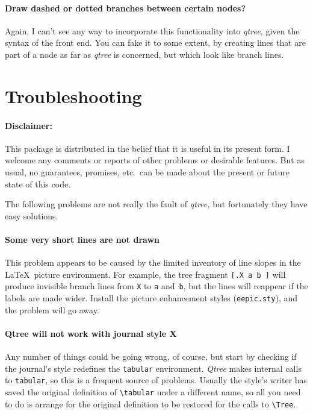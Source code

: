 \documentclass[11pt]{article}
\begin{document}
\paragraph{Draw dashed or dotted branches between certain nodes?}
Again, I can't see any way to incorporate this functionality into
\emph{qtree,} given the syntax of the front end.  You can fake it to some
extent, by creating lines that are part of a node as far as \emph{qtree} is
concerned, but which look like branch lines.


\section{Troubleshooting}
\paragraph*{Disclaimer:} This package is
distributed in the belief that it is useful in its present form.  
I welcome any comments or reports of other problems or desirable features.
But as usual, no guarantees, promises, etc.\ can be made about the present or
future state of this code.  

The following problems are not
really the fault of {\it qtree,\/} but fortunately they have easy solutions.

\paragraph{Some very short lines are not drawn}
This problem appears to be caused by the limited inventory of line slopes in
the \LaTeX\ picture environment.  For example, the tree fragment 
\verb|[.X a b ]| will produce invisible branch lines from \verb|X| to 
\verb|a| and~\verb|b|,
but the lines will reappear if the labels are made wider.  Install the picture
enhancement styles ({\tt eepic.sty\/}), and the problem will go away.

\paragraph{Qtree will not work with journal style X}

Any number of things could be going wrong, of course, but start by checking if
the journal's style redefines the {\tt tabular\/} environment.  {\it Qtree\/}
makes internal calls to {\tt tabular\/}, so this is a frequent source of
problems.  Usually the style's writer has saved the original definition of
\verb|\tabular| under a different name, so all you need to do is arrange for
the original definition to be restored for the calls to \verb|\Tree|.
\end{document}
